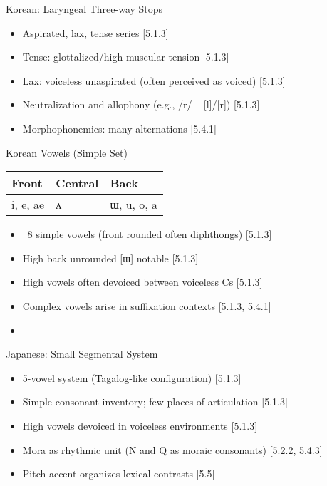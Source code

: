 \documentclass{beamer}
\newcommand{\booksrc}[1]{\hfill {\tiny [#1]}}
\begin{document}

\begin{frame}{Korean: Laryngeal Three-way Stops}
\begin{itemize}
\item Aspirated, lax, tense series \booksrc{5.1.3}
\item Tense: glottalized/high muscular tension \booksrc{5.1.3}
\item Lax: voiceless unaspirated (often perceived as voiced) \booksrc{5.1.3}
\item Neutralization and allophony (e.g., /r/ ~ [l]/[r]) \booksrc{5.1.3}
\item Morphophonemics: many alternations \booksrc{5.4.1}
\end{itemize}
\end{frame}

\begin{frame}{Korean Vowels (Simple Set)}
\begin{tabular}{lll}
Front & Central & Back \\
\hline
i, e, ae & ʌ & ɯ, u, o, a \\
\end{tabular}
\begin{itemize}
\item ~8 simple vowels (front rounded often diphthongs) \booksrc{5.1.3}
\item High back unrounded [ɯ] notable \booksrc{5.1.3}
\item High vowels often devoiced between voiceless Cs \booksrc{5.1.3}
\item Complex vowels arise in suffixation contexts \booksrc{5.1.3, 5.4.1}
\item %
\end{itemize}
\end{frame}

\begin{frame}{Japanese: Small Segmental System}
\begin{itemize}
\item 5-vowel system (Tagalog-like configuration) \booksrc{5.1.3}
\item Simple consonant inventory; few places of articulation \booksrc{5.1.3}
\item High vowels devoiced in voiceless environments \booksrc{5.1.3}
\item Mora as rhythmic unit (N and Q as moraic consonants) \booksrc{5.2.2, 5.4.3}
\item Pitch-accent organizes lexical contrasts \booksrc{5.5}
\end{itemize}
\end{frame}
\end{document}
